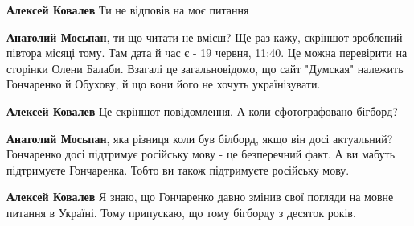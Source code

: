 \begin{itemize}
\begin{itemize}
 
\textbf{Алексей Ковалев} Ти не відповів на моє питання

 
\textbf{Анатолий Мосьпан}, ти що читати не вмієш? Ще раз кажу, скріншот зроблений півтора місяці тому. Там дата й час є - 19 червня, 11:40. Це можна перевірити на сторінки Олени Балаби. Взагалі це загальновідомо, що сайт "Думская" належить Гончаренко й Обухову, й що вони його не хочуть українізувати.

 
\textbf{Алексей Ковалев} Це скріншот повідомлення. А коли сфотографовано бігборд?

 
\textbf{Анатолий Мосьпан}, яка різниця коли був білборд, якщо він досі
актуальний? Гончаренко досі підтримує російську мову - це безперечний факт. А
ви мабуть підтримуєте Гончаренка. Тобто ви також підтримуєте російську мову.

 
\textbf{Алексей Ковалев} Я знаю, що Гончаренко давно змінив свої погляди на
мовне питання в Україні. Тому припускаю, що тому бігборду з десяток років.

 

\end{itemize}
\end{itemize}
